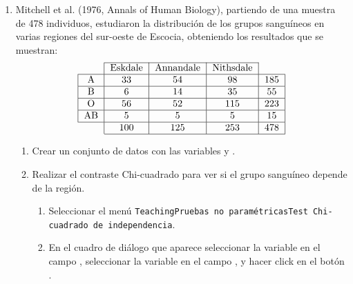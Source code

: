 \begin{enumerate}[leftmargin=*]
\item Mitchell et al. (1976, Annals of Human Biology), partiendo de una muestra de 478 individuos, estudiaron la
distribución de los grupos sanguíneos en varias regiones del sur-oeste de Escocia, obteniendo los resultados que se
muestran:
\[
\begin{tabular}{|l|l|l|l|l|}
\cline{2-4}
\multicolumn{1}{c|}{} & \multicolumn{1}{c|}{Eskdale} & \multicolumn{1}{c|}{Annandale} & \multicolumn{1}{c|}{Nithsdale} & \multicolumn{1}{c}{} \\
\hline
\multicolumn{1}{|c|}{A} & \multicolumn{1}{c|}{33} & \multicolumn{1}{c|}{54} & \multicolumn{1}{c|}{98} & \multicolumn{1}{c|}{185} \\
\hline
\multicolumn{1}{|c|}{B} & \multicolumn{1}{c|}{6} & \multicolumn{1}{c|}{14} & \multicolumn{1}{c|}{35} & \multicolumn{1}{c|}{55} \\
\hline
\multicolumn{1}{|c|}{O} & \multicolumn{1}{c|}{56} & \multicolumn{1}{c|}{52} & \multicolumn{1}{c|}{115} & \multicolumn{1}{c|}{223} \\
\hline
\multicolumn{1}{|c|}{AB} & \multicolumn{1}{c|}{5} & \multicolumn{1}{c|}{5} & \multicolumn{1}{c|}{5} & \multicolumn{1}{c|}{15} \\
\hline
\multicolumn{1}{c|}{} & \multicolumn{1}{c|}{100} & \multicolumn{1}{c|}{125} & \multicolumn{1}{c|}{253} & \multicolumn{1}{c|}{478} \\
\cline{2-5}
\end{tabular}
\]

\begin{enumerate}
\item Crear un conjunto de datos con las variables  y .

\item Realizar el contraste Chi-cuadrado para ver si el grupo sanguíneo depende de la región.  
\begin{indicacion}{
\begin{enumerate}
\item Seleccionar el menú \texttt{Teaching\flecha Pruebas no paramétricas\flecha Test Chi-cuadrado de independencia}.
\item En el cuadro de diálogo que aparece seleccionar la variable  en el campo
, seleccionar la variable  en el campo , y hacer click en el botón .
\end{enumerate}}
\end{indicacion}


\end{enumerate}
\end{enumerate}
